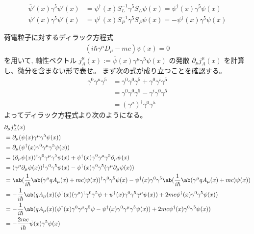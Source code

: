\documentclass[uplatex,dvipdfmx,a4paper,11pt]{jlreq}
\theoremstyle{definition}
\numberwithin{equation}{section}
\begin{document}
\begin{align}
  \bar\psi'(x)\gamma^5\psi'(x) & = \psi^\dagger(x)S_L^{-1}\gamma^5S_L\psi(x) = \psi^\dagger(x)\gamma^5\psi(x)  \\
  \bar\psi'(x)\gamma^5\psi'(x) & = \psi^\dagger(x)S_P^{-1}\gamma^5S_P\psi(x) = -\psi^\dagger(x)\gamma^5\psi(x)
\end{align}

荷電粒子に対するディラック方程式
\begin{align}
  (i\hbar\gamma^\mu D_\mu - mc)\psi(x) = 0
\end{align}
を用いて, 軸性ベクトル $j_A^\mu(x) := \bar{\psi}(x)\gamma^\mu\gamma^5\psi(x)$ の発散 $\partial_\mu j_A^\mu(x)$ を計算し、微分を含まない形で表せ。
まず次の式が成り立つことを確認する。
\begin{align}
  \gamma^0\gamma^\mu\gamma^5 & = \gamma^0\gamma^0\gamma^5 + \gamma^0\gamma^i\gamma^5 \\
                             & = \gamma^0\gamma^0\gamma^5 - \gamma^i\gamma^0\gamma^5 \\
                             & = (\gamma^\mu)^\dagger\gamma^0\gamma^5
\end{align}
よってディラック方程式より次のようになる。
\begin{align}
   & \partial_\mu j_A^\mu(x)                                                                                                                                                                    \\
   & = \partial_\mu(\bar{\psi}(x)\gamma^\mu\gamma^5\psi(x))                                                                                                                                     \\
   & = \partial_\mu(\psi^\dagger(x)\gamma^0\gamma^\mu\gamma^5\psi(x))                                                                                                                           \\
   & = (\partial_\mu\psi(x))^\dagger\gamma^0\gamma^\mu\gamma^5\psi(x) + \psi^\dagger(x)\gamma^0\gamma^\mu\gamma^5\partial_\mu\psi(x)                                                            \\
   & = (\gamma^\mu\partial_\mu\psi(x))^\dagger\gamma^0\gamma^5\psi(x) - \psi^\dagger(x)\gamma^0\gamma^5(\gamma^\mu\partial_\mu\psi(x))                                                          \\
   & = \ab(\frac{1}{i\hbar}\ab(\gamma^\mu qA_\mu(x) + mc)\psi(x))^\dagger\gamma^0\gamma^5\psi(x) - \psi^\dagger(x)\gamma^0\gamma^5\ab(\frac{1}{i\hbar}\ab(\gamma^\mu qA_\mu(x) + mc)\psi(x))    \\
   & = -\frac{1}{i\hbar}\ab(qA_\mu(x)(\psi^\dagger(x)(\gamma^\mu)^\dagger\gamma^0\gamma^5\psi + \psi^\dagger(x)\gamma^0\gamma^5\gamma^\mu \psi(x)) + 2mc\psi^\dagger(x)\gamma^0\gamma^5\psi(x)) \\
   & = -\frac{1}{i\hbar}\ab(qA_\mu(x)(\psi^\dagger(x)\gamma^0\gamma^\mu\gamma^5\psi - \psi^\dagger(x)\gamma^0\gamma^\mu\gamma^5 \psi(x)) + 2mc\psi^\dagger(x)\gamma^0\gamma^5\psi(x))           \\
   & = -\frac{2mc}{i\hbar}\bar{\psi}(x)\gamma^5\psi(x)
\end{align}
\end{document}
